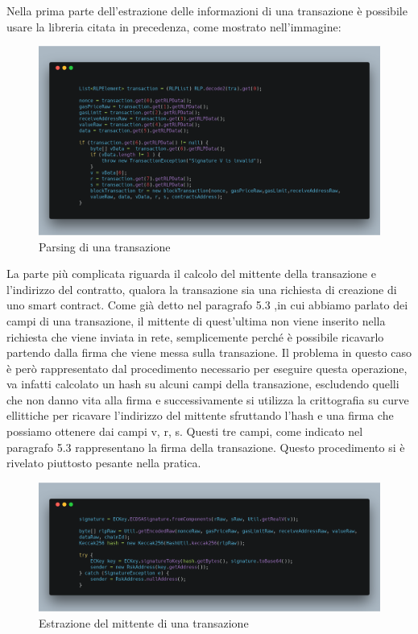 \documentclass[12pt]{report}
\begin{document}
Nella prima parte dell'estrazione delle informazioni di una transazione è possibile usare la libreria citata in precedenza, come mostrato nell'immagine:
\begin{figure}[H]
    \includegraphics[width=\textwidth]{carbon-15}
    \caption{Parsing di una transazione}
\end{figure}
La parte più complicata riguarda il calcolo del mittente della transazione e l'indirizzo del contratto, qualora la transazione sia una richiesta di creazione di uno smart contract.
Come già detto nel paragrafo 5.3 ,in cui abbiamo parlato dei campi di una transazione, il mittente di quest'ultima non viene inserito nella richiesta che viene inviata in rete, semplicemente perché è possibile ricavarlo partendo dalla firma che viene messa sulla transazione.
Il problema in questo caso è però rappresentato dal procedimento necessario per eseguire questa operazione, va infatti calcolato un hash su alcuni campi della transazione, escludendo quelli che non danno vita alla firma e successivamente si utilizza la crittografia su curve ellittiche per ricavare l'indirizzo del mittente sfruttando l'hash e una firma che possiamo ottenere dai campi v, r, s. Questi tre campi, come indicato nel paragrafo 5.3 rappresentano la firma della transazione. 
Questo procedimento si è rivelato piuttosto pesante nella pratica.

\begin{figure}[H]
    \includegraphics[width=\textwidth]{carbon-16}
    \caption{Estrazione del mittente di una transazione}
\end{figure}
\end{document}

